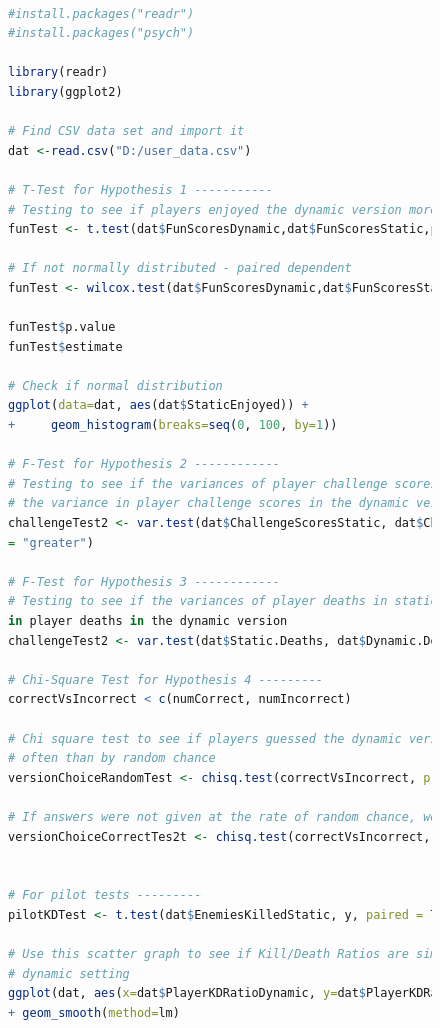\documentclass[journal]{IEEEtran}
\begin{document}
\begin{center}
\begin{figure}

\begin{lstlisting}[language=R]

#install.packages("readr")
#install.packages("psych")

library(readr)
library(ggplot2)

# Find CSV data set and import it
dat <-read.csv("D:/user_data.csv")

# T-Test for Hypothesis 1 -----------
# Testing to see if players enjoyed the dynamic version more than the static
funTest <- t.test(dat$FunScoresDynamic,dat$FunScoresStatic,paired=TRUE, alternative="greater")

# If not normally distributed - paired dependent
funTest <- wilcox.test(dat$FunScoresDynamic,dat$FunScoresStatic, paired = TRUE,  alternative="greater")

funTest$p.value
funTest$estimate

# Check if normal distribution
ggplot(data=dat, aes(dat$StaticEnjoyed)) + 
+     geom_histogram(breaks=seq(0, 100, by=1))

# F-Test for Hypothesis 2 ------------
# Testing to see if the variances of player challenge scores in static version is higher than 
# the variance in player challenge scores in the dynamic version
challengeTest2 <- var.test(dat$ChallengeScoresStatic, dat$ChallengeScoresDynamic, alternative
= "greater")

# F-Test for Hypothesis 3 ------------
# Testing to see if the variances of player deaths in static version is higher than the variance
in player deaths in the dynamic version
challengeTest2 <- var.test(dat$Static.Deaths, dat$Dynamic.Deaths, alternative = "greater")

# Chi-Square Test for Hypothesis 4 ---------
correctVsIncorrect < c(numCorrect, numIncorrect)

# Chi square test to see if players guessed the dynamic version correctly more significantly
# often than by random chance
versionChoiceRandomTest <- chisq.test(correctVsIncorrect, p = c(1/2, 1/2))

# If answers were not given at the rate of random chance, were answers more often correct?
versionChoiceCorrectTes2t <- chisq.test(correctVsIncorrect, p = c(4/5, 1/5))


# For pilot tests ---------
pilotKDTest <- t.test(dat$EnemiesKilledStatic, y, paired = TRUE, alternative = "two.sided")

# Use this scatter graph to see if Kill/Death Ratios are similar between players using the
# dynamic setting
ggplot(dat, aes(x=dat$PlayerKDRatioDynamic, y=dat$PlayerKDRatioDynamic)) + geom_point() 
+ geom_smooth(method=lm)


\end{lstlisting}

\end{figure}

\end{center}
 
\end{document}
